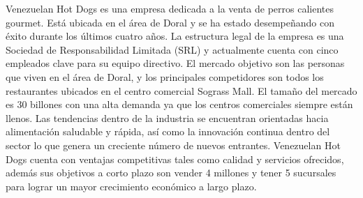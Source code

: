 

Venezuelan Hot Dogs es una empresa dedicada a la venta de perros calientes gourmet. Está ubicada en el área de Doral y se ha estado desempeñando con éxito durante los últimos cuatro años. La estructura legal de la empresa es una Sociedad de Responsabilidad Limitada (SRL) y actualmente cuenta con cinco empleados clave para su equipo directivo. El mercado objetivo son las personas que viven en el área de Doral, y los principales competidores son todos los restaurantes ubicados en el centro comercial Sograss Mall. El tamaño del mercado es 30 billones con una alta demanda ya que los centros comerciales siempre están llenos. Las tendencias dentro de la industria se encuentran orientadas hacia alimentación saludable y rápida, así como la innovación continua dentro del sector lo que genera un creciente número de nuevos entrantes. Venezuelan Hot Dogs cuenta con ventajas competitivas tales como calidad y servicios ofrecidos, además sus objetivos a corto plazo son vender 4 millones y tener 5 sucursales para lograr un mayor crecimiento económico a largo plazo.